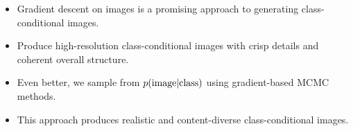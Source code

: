 \documentclass[landscape,a0b,final,a4resizeable]{include/a0poster}
\begin{document}
\begin{poster}
\begin{center}
\begin{pcolumn}{0.99}
{}
\end{pcolumn}
\end{center}

\vspace*{2.5cm}

\large




\begin{multicols}{3}
%
% 
\vspace{0.5in}
% 
\begin{itemize}
	\item Gradient descent on images is a promising approach to generating class-conditional images.
	\item Produce high-resolution class-conditional images with crisp details and coherent overall structure.
	\item Even better, we sample from $p(\textnormal{image} | \textnormal{class})$ using gradient-based MCMC methods.
	\item This approach produces realistic and content-diverse class-conditional images.

\end{itemize}
\end{multicols}
\end{poster}
\end{document}
